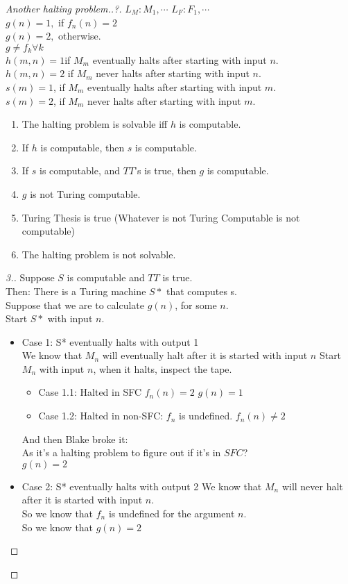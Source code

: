 
\begin{proof}[Another halting problem..?]
$L_M: M_1, \cdots$
$L_F: F_1, \cdots$ \\
$g(n) = 1,$ if $f_n(n) = 2$ \\
$g(n) = 2,$ otherwise. \\
$g \not = f_k \forall k$ \\
$h(m,n)= 1 $if $M_m$ eventually halts after starting with input $n$. \\
$h(m,n)= 2$ if $M_m$ never halts after starting with input $n$. \\
$s(m) = 1$, if $M_m$ eventually halts after starting with input $m$. \\
$s(m) = 2$, if $M_m$ never halts after starting with input $m$. \\
\begin{enumerate}
\item The halting problem is solvable iff $h$ is computable.
\item If $h$ is computable, then $s$ is computable.
\item If $s$ is computable, and $TT$'s is true, then $g$ is computable.
\item $g$ is not Turing computable.
\item Turing Thesis is true (Whatever is not Turing Computable is not computable)
\item The halting problem is not solvable.
\end{enumerate}
\begin{proof}[3.]
Suppose $S$ is computable and $TT$ is true. \\
Then: There is a Turing machine $S*$ that computes s.\\
Suppose that we are to calculate $g(n)$, for some $n$. \\
Start $S*$ with input $n$. \\
\begin{itemize}
\item Case 1: S* eventually halts with output 1\\
We know that $M_n$ will eventually halt after it is started with input $n$
Start $M_n$ with input $n$, when it halts, inspect the tape.
\begin{itemize}
\item Case 1.1: Halted in SFC
$f_n(n) = 2$ 
$g(n) = 1$
\item Case 1.2: Halted in non-SFC: $f_n$ is undefined.
$f_n(n) \not=2$
\end{itemize}
\large {
And then Blake broke it: \\
As it's a halting problem to figure out if it's in $SFC$?\\ }
\normalsize
$g(n)=2$
\item Case 2: S* eventually halts with output 2
We know that $M_n$ will never halt after it is started with input $n$. \\
So we know that $f_n$ is undefined for the argument $n$. \\
So we know that $g(n) = 2$ \\
\end{itemize}


\end{proof}
\end{proof}
